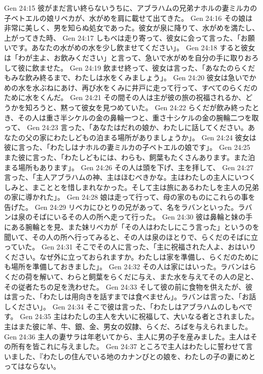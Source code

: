 Gen 24:15  彼がまだ言い終らないうちに、アブラハムの兄弟ナホルの妻ミルカの子ベトエルの娘リベカが、水がめを肩に載せて出てきた。
Gen 24:16  その娘は非常に美しく、男を知らぬ処女であった。彼女が泉に降りて、水がめを満たし、上がってきた時、
Gen 24:17  しもべは走り寄って、彼女に会って言った、「お願いです。あなたの水がめの水を少し飲ませてください」。
Gen 24:18  すると彼女は「わが主よ、お飲みください」と言って、急いで水がめを自分の手に取りおろして彼に飲ませた。
Gen 24:19  飲ませ終って、彼女は言った、「あなたのらくだもみな飲み終るまで、わたしは水をくみましょう」。
Gen 24:20  彼女は急いでかめの水を水ぶねにあけ、再び水をくみに井戸に走って行って、すべてのらくだのために水をくんだ。
Gen 24:21  その間その人は主が彼の旅の祝福されるか、どうかを知ろうと、黙って彼女を見つめていた。
Gen 24:22  らくだが飲み終ったとき、その人は重さ半シケルの金の鼻輪一つと、重さ十シケルの金の腕輪二つを取って、
Gen 24:23  言った、「あなたはだれの娘か、わたしに話してください。あなたの父の家にわたしどもの泊まる場所がありましょうか」。
Gen 24:24  彼女は彼に言った、「わたしはナホルの妻ミルカの子ベトエルの娘です」。
Gen 24:25  また彼に言った、「わたしどもには、わらも、飼葉もたくさんあります。また泊まる場所もあります」。
Gen 24:26  その人は頭を下げ、主を拝して、
Gen 24:27  言った、「主人アブラハムの神、主はほむべきかな。主はわたしの主人にいつくしみと、まこととを惜しまれなかった。そして主は旅にあるわたしを主人の兄弟の家に導かれた」。
Gen 24:28  娘は走って行って、母の家のものにこれらの事を告げた。
Gen 24:29  リベカにひとりの兄があって、名をラバンといった。ラバンは泉のそばにいるその人の所へ走って行った。
Gen 24:30  彼は鼻輪と妹の手にある腕輪とを見、また妹リベカが「その人はわたしにこう言った」というのを聞いて、その人の所へ行ってみると、その人は泉のほとりで、らくだのそばに立っていた。
Gen 24:31  そこでその人に言った、「主に祝福された人よ、おはいりください。なぜ外に立っておられますか。わたしは家を準備し、らくだのためにも場所を準備しておきました」。
Gen 24:32  その人は家にはいった。ラバンはらくだの荷を解いて、わらと飼葉をらくだに与え、また水を与えてその人の足と、その従者たちの足を洗わせた。
Gen 24:33  そして彼の前に食物を供えたが、彼は言った、「わたしは用向きを話すまでは食べません」。ラバンは言った、「お話しください」。
Gen 24:34  そこで彼は言った、「わたしはアブラハムのしもべです。
Gen 24:35  主はわたしの主人を大いに祝福して、大いなる者とされました。主はまた彼に羊、牛、銀、金、男女の奴隷、らくだ、ろばを与えられました。
Gen 24:36  主人の妻サラは年老いてから、主人に男の子を産みました。主人はその所有を皆これに与えました。
Gen 24:37  ところで主人はわたしに誓わせて言いました、『わたしの住んでいる地のカナンびとの娘を、わたしの子の妻にめとってはならない。
